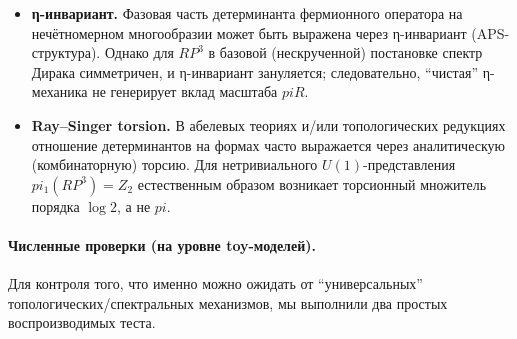 \documentclass[12pt]{article}
\def\mathbb#1{#1}%
\def\pi{pi}%
\begin{document}
\begin{itemize}
  \item \textbf{η-инвариант.}
  Фазовая часть детерминанта фермионного оператора на нечётномерном многообразии может быть выражена через η-инвариант (APS-структура).
  Однако для $\mathbb{RP}^3$ в базовой (нескрученной) постановке спектр Дирака симметричен, и η-инвариант зануляется; следовательно, ``чистая'' η-механика не генерирует вклад масштаба $\pi R$.

  \item \textbf{Ray--Singer torsion.}
  В абелевых теориях и/или топологических редукциях отношение детерминантов на формах часто выражается через аналитическую (комбинаторную) торсию.
  Для нетривиального $U(1)$-представления $\pi_1(\mathbb{RP}^3)=\mathbb{Z}_2$ естественным образом возникает торсионный множитель порядка $\log 2$, а не $\pi$.
\end{itemize}

\paragraph{Численные проверки (на уровне toy-моделей).}
Для контроля того, что именно можно ожидать от ``универсальных'' топологических/спектральных механизмов, мы выполнили два простых воспроизводимых теста.
\end{document}
